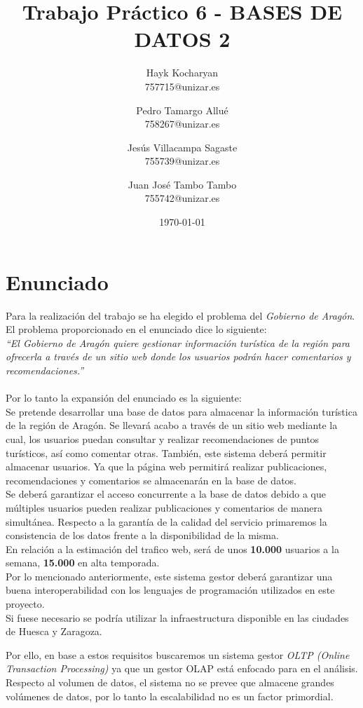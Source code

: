 \documentclass{article}
\title{Trabajo Práctico 6 - BASES DE DATOS 2}
\author{
  Hayk Kocharyan\\
  757715@unizar.es
  \and
  Pedro Tamargo Allué\\
  758267@unizar.es
  \and
  Jesús Villacampa Sagaste\\
  755739@unizar.es
  \and
  Juan José Tambo Tambo\\
  755742@unizar.es
}
\date{\today}
\begin{document}
\maketitle

%
\tableofcontents

\newpage 

\section{Enunciado}
Para la realización del trabajo se ha elegido el problema del \emph{Gobierno de Aragón}. El problema proporcionado en el enunciado dice lo siguiente:\\

\emph{``El Gobierno de Aragón quiere gestionar información turística de la región para ofrecerla a través de un sitio web donde los usuarios podrán hacer comentarios y recomendaciones.''}
\\\\
Por lo tanto la expansión del enunciado es la siguiente:\\

Se pretende desarrollar una base de datos para almacenar la información turística de la región de Aragón. Se llevará acabo a través de un sitio web mediante la cual, los usuarios puedan consultar y realizar recomendaciones  de puntos turísticos, así como comentar otras. También, este sistema deberá permitir almacenar usuarios. Ya que  la página web permitirá realizar publicaciones, recomendaciones y comentarios se almacenarán en la base de datos.\\
Se deberá garantizar el acceso concurrente a la base de datos debido a que múltiples usuarios pueden realizar publicaciones y comentarios de manera simultánea.
Respecto a la garantía de la calidad del servicio primaremos la consistencia de los datos frente a la disponibilidad de la misma.\\
En relación a la  estimación del trafico web, será de unos \textbf{10.000} usuarios a la semana, \textbf{15.000} en alta temporada.\\

Por lo mencionado anteriormente, este sistema gestor deberá garantizar una buena interoperabilidad con los lenguajes de programación utilizados en este proyecto. \\

Si fuese necesario se podría utilizar la infraestructura disponible en las ciudades de Huesca y Zaragoza.

Por ello, en base a estos requisitos buscaremos un sistema gestor \textit{OLTP (Online Transaction Processing)} ya que un gestor OLAP está enfocado para en el análisis. Respecto al volumen de datos, el sistema no se prevee que almacene grandes volúmenes de datos, por lo tanto la escalabilidad no es un factor primordial.
\end{document}

